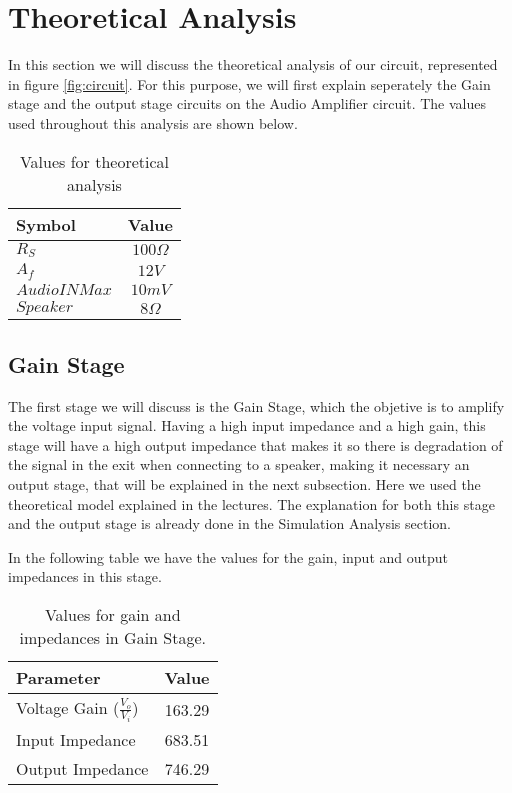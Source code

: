 \newpage
\section{Theoretical Analysis}
\label{sec:analysis}

In this section we will discuss the theoretical analysis of our circuit, represented in figure \ref{fig:circuit}. For this purpose, we will first explain seperately the Gain stage and the output stage circuits on the Audio Amplifier circuit. The values used throughout this analysis are shown below. 

\begin{table}[h]
    \centering
    \begin{tabular}{|l|c|}
    \hline
    {\bf Symbol} & {\bf Value} \\ \hline
    $R_{S}$ & $100\Omega$ \\ \hline
    $A_f$ & $12 V$ \\ \hline
    $Audio IN Max$ & $10 mV$  \\ \hline
    $Speaker$ & $8 \Omega$\\ \hline
    \end{tabular}
    \caption{Values for theoretical analysis}
    \label{tab:values}
\end{table}


\subsection{Gain Stage}
\label{sec:gain}


The first stage we will discuss is the Gain Stage, which the objetive is to amplify the voltage input signal. Having a high input impedance and a high gain, this stage will have a high output impedance that makes it so there is degradation of the signal in the exit when connecting to a speaker, making it necessary an output stage, that will be explained in the next subsection. Here we used the theoretical model explained in the lectures. The explanation for both this stage and the output stage is already done in the Simulation Analysis section.

In the following table we have the values for the gain, input and output impedances in this stage.


\begin{table}[h]
    \centering
    \begin{tabular}{|l|c|}
    \hline
    {\bf Parameter} & {\bf Value} \\ \hline \hline
    Voltage Gain ($\frac{V_{o}}{V_{i}}$)  & 163.29 \\ \hline
    Input Impedance & 683.51 \\ \hline
    Output Impedance  & 746.29  \\ \hline
    \end{tabular}
    \caption{Values for gain and impedances in Gain Stage.}
    \label{tab:values}
\end{table}


